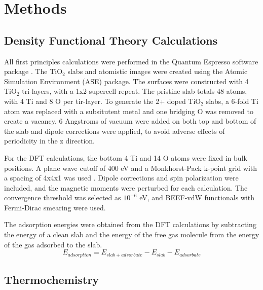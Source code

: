 \section{Methods}
\subsection{Density Functional Theory Calculations}
All first principles calculations were performed in the Quantum Espresso software package \cite{QE-2009}.
The TiO$_2$ slabs and atomistic images were created using the Atomic Simulation Environment (ASE) package\cite{Hjorth_Larsen_2017}. The surfaces were constructed with 4 TiO$_2$ tri-layers, with a 1x2 supercell repeat. The pristine slab totals 48 atoms, with 4 Ti and 8 O per tir-layer. To generate the 2+ doped TiO$_2$ slabs, a 6-fold Ti atom was replaced with a subsitutent metal and one bridging O was removed to create a vacancy. 6 Angstroms of vacuum were added on both top and bottom of the slab and dipole corrections were applied, to avoid adverse effects of periodicity in the z direction.

For the DFT calculations, the bottom 4 Ti and 14 O atoms were fixed in bulk positions. A plane wave cutoff of 400 eV and a Monkhorst-Pack k-point grid with a spacing of 4x4x1 was used \cite{Monkhorst_1976}. Dipole corrections and spin polarization were included, and the magnetic moments were perturbed for each calculation. The convergence threshold was selected as $10^{-6}$ eV, and BEEF-vdW functionals \cite{Wellendorff_2012} with Fermi-Dirac smearing were used.

The adsorption energies were obtained from the DFT calculations by subtracting the energy of a clean slab and the energy of the free gas molecule from the energy of the gas adsorbed to the slab.
\begin{equation}
E_{adsorption} = E_{slab+adsorbate} - E_{slab} - E_{adsorbate}
\end{equation}

\subsection{Thermochemistry}
\cite{ase-paper,Reuter_2005}

